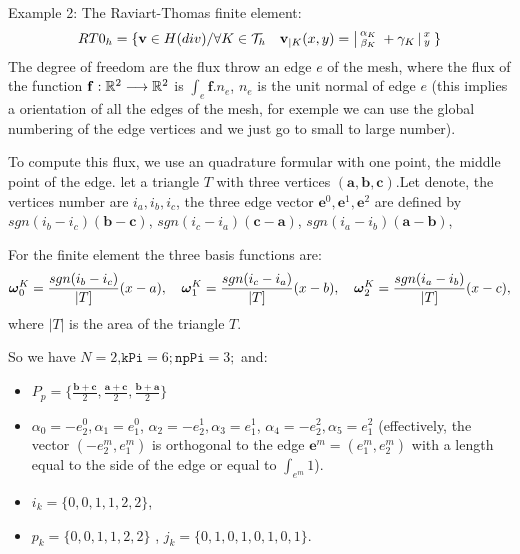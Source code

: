  Example 2: The Raviart-Thomas finite element: 
    \begin{equation}
         RT0_{h} = \{ \mathbf{v} \in H(div) / \forall K \in
         \mathcal{T}_{h} \quad  \mathbf{v}_{|K}(x,y) =
         \left|\begin{smallmatrix} \alpha_{K} \\ \beta_{K} \end{smallmatrix}\right. + \gamma_{K}\left|\begin{smallmatrix} x \\ y \end{smallmatrix}\right.  \}
         \label{eq:RT0-fe}
     \end{equation}
 The degree of freedom are the flux   throw an edge $e$ of the mesh, where the flux of
 the function $\mathbf{f} : \mathbb{R}^2 \longrightarrow \mathbb{R}^2 $ is $\int_{e} \mathbf{f}.n_{e}$,
 $n_{e}$ is the unit normal of edge $e$ (this implies a orientation of all  the edges of the mesh,
 for exemple we can use the global numbering of the edge vertices and we just go to small to large number).
 
 
  To compute this flux, we use an quadrature formular with one point, the middle point
  of the edge. let a triangle $T$ with three vertices $(\mathbf{a},\mathbf{b},\mathbf{c})$.Let denote, the  vertices number are  $i_{a},i_{b},i_{c}$, the three edge vector $\mathbf{e}^{0},\mathbf{e}^{1},\mathbf{e}^{2}$ are 
  defined by $ sgn(i_{b}-i_{c})(\mathbf{b}-\mathbf{c})$, $sgn(i_{c}-i_{a})(\mathbf{c}-\mathbf{a})$, $sgn(i_{a}-i_{b})(\mathbf{a}-\mathbf{b})$, 
  
  For the finite element the three basis functions are:
 $$\boldsymbol{\omega}^{K}_{0}= \frac{sgn(i_{b}-i_{c})}{|T]}(x-a),\quad
  \boldsymbol{\omega}^{K}_{1}= \frac{sgn(i_{c}-i_{a})}{|T]}(x-b),\quad
  \boldsymbol{\omega}^{K}_{2}= \frac{sgn(i_{a}-i_{b})}{|T]}(x-c),$$
   where $|T|$ is the area of the triangle $T$.
   \medskip
  
So we have  $N=2$,$\mathtt{kPi}=6; \mathtt{npPi}=3;$ and:
\begin{itemize}
\item $P_{p} = \{ \frac{\mathbf{b}+\mathbf{c}}{2},\frac{\mathbf{a}+\mathbf{c}}{2}, \frac{\mathbf{b}+{\mathbf{a}}}{2}\}$

\item 
 $\alpha_{0}= - {e}^{0}_{2}, \alpha_{1}= {e}^{0}_{1}$,  
 $\alpha_{2}= - {e}^{1}_{2}, \alpha_{3}= {e}^{1}_{1}$,   
 $\alpha_{4}= - {e}^{2}_{2}, \alpha_{5}= {e}^{2}_{1}$ (effectively, the vector 
 $ ( -{e}^{m}_{2}, {e}^{m}_{1}) $ is orthogonal to the edge $\mathbf{e}^{m}= (e^m_{1},e^m_{2})$ with 
 a length equal to the side of the edge or equal to  $\int_{e^m} 1$).
\item $i_{k}=\{0,0,1,1,2,2\}$, 
\item $p_{k}=\{0,0,1,1,2,2\}$ ,  $j_{k}=\{0,1,0,1,0,1,0,1\}$.

 

\end{itemize}

